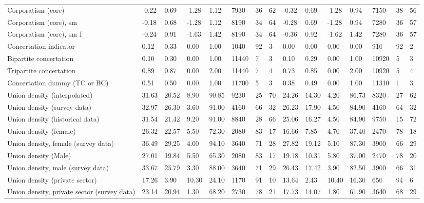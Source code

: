 \begin{longtable}{lllllllllllllll}
Corporatism (core) & -0.22 & 0.69 & -1.28 & 1.12 & 7930 & 36 & 62 & -0.32 & 0.69 & -1.28 & 0.94 & 7150 & 38 & 56\\
\addlinespace
Corporatism (core), sm & -0.18 & 0.68 & -1.28 & 1.12 & 8190 & 34 & 64 & -0.28 & 0.69 & -1.28 & 0.94 & 7280 & 36 & 57\\
Corporatism (core), sm f & -0.24 & 0.91 & -1.63 & 1.42 & 8190 & 34 & 64 & -0.36 & 0.92 & -1.62 & 1.42 & 7280 & 36 & 57\\
Concertation indicator & 0.12 & 0.33 & 0.00 & 1.00 & 1040 & 92 & 3 & 0.00 & 0.00 & 0.00 & 0.00 & 910 & 92 & 2\\
Bipartite concertation & 0.10 & 0.30 & 0.00 & 1.00 & 11440 & 7 & 3 & 0.10 & 0.29 & 0.00 & 1.00 & 10920 & 5 & 3\\
Tripartite concertation & 0.89 & 0.87 & 0.00 & 2.00 & 11440 & 7 & 4 & 0.73 & 0.85 & 0.00 & 2.00 & 10920 & 5 & 4\\
\addlinespace
Concertation dummy (TC or BC) & 0.51 & 0.50 & 0.00 & 1.00 & 11700 & 5 & 3 & 0.38 & 0.49 & 0.00 & 1.00 & 11310 & 1 & 3\\
Union density (interpolated) & 31.63 & 20.52 & 8.90 & 90.85 & 9230 & 25 & 70 & 24.26 & 14.30 & 4.20 & 86.73 & 8320 & 27 & 62\\
Union density (survey data) & 32.97 & 26.30 & 3.60 & 91.00 & 4160 & 66 & 32 & 26.23 & 17.90 & 4.50 & 84.90 & 4160 & 64 & 32\\
Union density (historical data) & 31.54 & 21.42 & 9.20 & 91.00 & 8840 & 28 & 66 & 25.06 & 16.27 & 4.50 & 84.90 & 9750 & 15 & 72\\
Union density (female) & 26.32 & 22.57 & 5.50 & 72.30 & 2080 & 83 & 17 & 16.66 & 7.85 & 4.70 & 37.40 & 2470 & 78 & 18\\
\addlinespace
Union density, female (survey data) & 36.49 & 29.25 & 4.00 & 94.10 & 3640 & 71 & 28 & 27.82 & 19.12 & 5.10 & 87.30 & 3900 & 66 & 29\\
Union density (Male) & 27.01 & 19.84 & 5.50 & 65.30 & 2080 & 83 & 17 & 19.18 & 10.31 & 5.80 & 37.00 & 2470 & 78 & 20\\
Union density, male (survey data) & 33.67 & 25.79 & 3.30 & 88.00 & 3640 & 71 & 29 & 26.43 & 17.42 & 3.90 & 82.50 & 3900 & 66 & 31\\
Union density (private sector) & 17.26 & 3.90 & 10.30 & 24.10 & 1170 & 91 & 10 & 13.64 & 2.43 & 10.40 & 16.30 & 650 & 94 & 6\\
Union density, private sector (survey data) & 23.14 & 20.94 & 1.30 & 68.20 & 2730 & 78 & 21 & 17.73 & 14.07 & 1.80 & 61.90 & 3640 & 68 & 29\\

\end{longtable}
